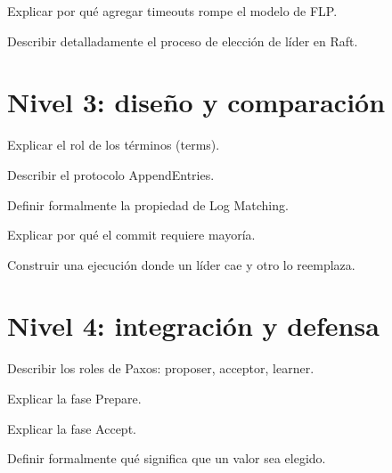 \documentclass[variant=guia,cover=institutional,mode=screen]{ua-engineering-v6-article}
\begin{document}
\begin{uaexercise}
Explicar por qué agregar timeouts rompe el modelo de FLP.
\end{uaexercise}

\begin{uaexercise}
Describir detalladamente el proceso de elección de líder en Raft.
\end{uaexercise}


\section{Nivel 3: diseño y comparación}
\begin{uaexercise}
Explicar el rol de los términos (terms).
\end{uaexercise}

\begin{uaexercise}
Describir el protocolo AppendEntries.
\end{uaexercise}

\begin{uaexercise}
Definir formalmente la propiedad de Log Matching.
\end{uaexercise}

\begin{uaexercise}
Explicar por qué el commit requiere mayoría.
\end{uaexercise}

\begin{uaexercise}
Construir una ejecución donde un líder cae y otro lo reemplaza.
\end{uaexercise}


\section{Nivel 4: integración y defensa}
\begin{uaexercise}
Describir los roles de Paxos: proposer, acceptor, learner.
\end{uaexercise}

\begin{uaexercise}
Explicar la fase Prepare.
\end{uaexercise}

\begin{uaexercise}
Explicar la fase Accept.
\end{uaexercise}

\begin{uaexercise}
Definir formalmente qué significa que un valor sea elegido.
\end{uaexercise}
\end{document}

